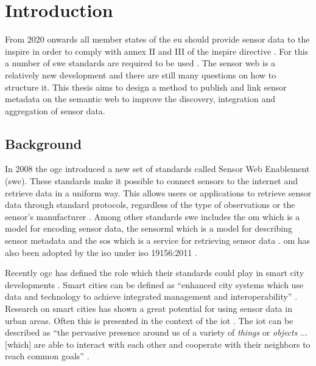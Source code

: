 
\section{Introduction}
\label{chap:introduction}
From 2020 onwards all member states of the \ac{eu} should provide sensor data to the \ac{inspire} in order to comply with annex II and III of the \ac{inspire} directive \citep{SDI:INSPIRE5}. For this a number of \ac{swe} standards are required to be used \citep{SDI:INSPIRE2}. The sensor web is a relatively new development and there are still many questions on how to structure it. This thesis aims to design a method to publish and link sensor metadata on the semantic web to improve the discovery, integration and aggregation of sensor data.

\subsection{Background}
In 2008 the \ac{ogc} introduced a new set of standards called Sensor Web Enablement (\ac{swe}). These standards make it possible to connect sensors to the internet and retrieve data in a uniform way. This allows users or applications to retrieve sensor data through standard protocols, regardless of the type of observations or the sensor's manufacturer \citep{SW:Botts}. Among other standards \ac{swe} includes the \ac{om} which is a model for encoding sensor data, the \ac{sensorml} which is a model for describing sensor metadata and the \ac{sos} which is a service for retrieving sensor data \citep{SW:OGC}. \ac{om} has also been adopted by the \ac{iso} under \ac{iso} 19156:2011 \citep{SW:ISO}. 

Recently \ac{ogc} has defined the role which their standards could play in smart city developments \citep{SC:OGC}. Smart cities can be defined as \enquote{enhanced city systems which use data and technology to achieve integrated management and interoperability} \citep[p. 18]{SC:Moir}. Research on smart cities has shown a great potential for using sensor data in urban areas. Often this is presented in the context of the \ac{iot} \citep{IOT:Zanelli, SSW:Wang2}. The \ac{iot} can be described as \enquote{the pervasive presence around us of a variety of \textit{things} or \textit{objects} ... [which] are able to interact with each other and cooperate with their neighbors to reach common goals} \cite[p. 2787]{IOT:Atzori}. 

